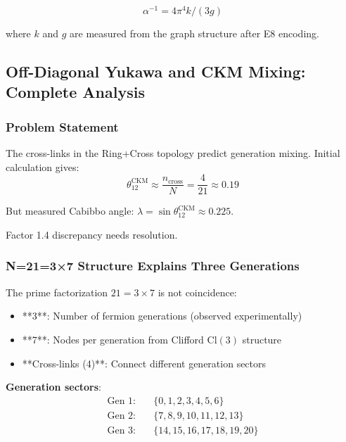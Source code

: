 \documentclass[12pt,a4paper]{article}
\begin{document}
\begin{equation}
\alpha^{-1} = 4\pi^4 k / (3g)
\end{equation}

where $k$ and $g$ are measured from the graph structure after E8 encoding.

\subsection{Off-Diagonal Yukawa and CKM Mixing: Complete Analysis}

\subsubsection{Problem Statement}

The cross-links in the Ring+Cross topology predict generation mixing. Initial calculation gives:
\begin{equation}
\theta_{12}^{\mathrm{CKM}} \approx \frac{n_{\mathrm{cross}}}{N} = \frac{4}{21} \approx 0.19
\end{equation}

But measured Cabibbo angle: $\lambda = \sin \theta_{12}^{\mathrm{CKM}} \approx 0.225$.

Factor 1.4 discrepancy needs resolution.

\subsubsection{N=21=3×7 Structure Explains Three Generations}

The prime factorization $21 = 3 \times 7$ is not coincidence:

\begin{itemize}
\item **3**: Number of fermion generations (observed experimentally)
\item **7**: Nodes per generation from Clifford $\mathrm{Cl}(3)$ structure
\item **Cross-links (4)**: Connect different generation sectors
\end{itemize}

\textbf{Generation sectors}:
\begin{align}
\text{Gen 1}: &\quad \{0, 1, 2, 3, 4, 5, 6\} \\
\text{Gen 2}: &\quad \{7, 8, 9, 10, 11, 12, 13\} \\
\text{Gen 3}: &\quad \{14, 15, 16, 17, 18, 19, 20\}
\end{align}
\end{document}
